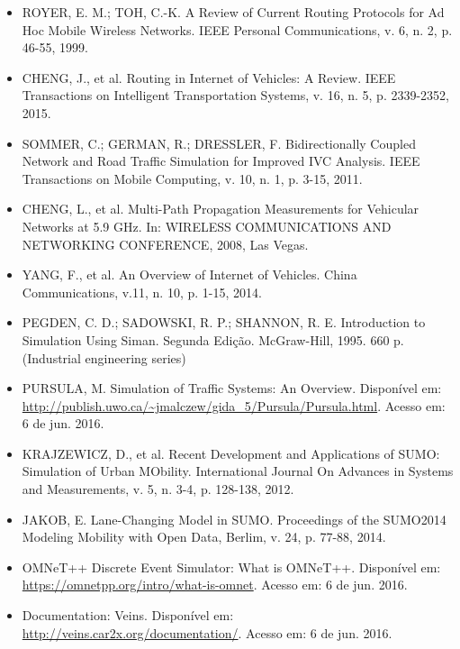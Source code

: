 \documentclass[
12pt,				%
openright,			%
oneside,			%
a4paper,			%
brazil,				%
]{abntex2}
\begin{document}
{\begin{itemize}[label={}]
		\item ROYER, E. M.; TOH, C.-K. A Review of Current Routing Protocols for Ad Hoc Mobile Wireless Networks. IEEE Personal Communications, v. 6, n. 2, p. 46-55, 1999.
		
		\item CHENG, J., et al. Routing in Internet of Vehicles: A Review. IEEE Transactions on Intelligent Transportation Systems, v. 16, n. 5, p. 2339-2352, 2015.
		
		\item SOMMER, C.; GERMAN, R.; DRESSLER, F. Bidirectionally Coupled Network and Road Traffic Simulation for Improved IVC Analysis. IEEE Transactions on Mobile Computing, v. 10, n. 1, p. 3-15, 2011.
		
		\item CHENG, L., et al. Multi-Path Propagation Measurements for Vehicular Networks at 5.9 GHz. In: WIRELESS COMMUNICATIONS AND NETWORKING CONFERENCE, 2008, Las Vegas.
		
		\item YANG, F., et al. An Overview of Internet of Vehicles. China Communications, v.11, n. 10, p. 1-15, 2014.
		
		\item PEGDEN, C. D.; SADOWSKI, R. P.; SHANNON, R. E. Introduction to Simulation Using Siman. Segunda Edição. McGraw-Hill, 1995. 660 p. (Industrial engineering series)
		
		\item PURSULA, M. Simulation of Traffic Systems: An Overview. Disponível em: \url{http://publish.uwo.ca/~jmalczew/gida\_5/Pursula/Pursula.html}. Acesso em: 6 de jun. 2016.
		
		\item KRAJZEWICZ, D., et al. Recent Development and Applications of SUMO: Simulation of Urban MObility. International Journal On Advances in Systems and Measurements, v. 5, n. 3-4, p. 128-138, 2012.
		
		\item JAKOB, E. Lane-Changing Model in SUMO. Proceedings of the SUMO2014 Modeling Mobility with Open Data, Berlim, v. 24, p. 77-88, 2014.
		
		\item OMNeT++ Discrete Event Simulator: What is OMNeT++. Disponível em: \url{https://omnetpp.org/intro/what-is-omnet}. Acesso em: 6 de jun. 2016.
		
		\item Documentation: Veins. Disponível em: \url{http://veins.car2x.org/documentation/}. Acesso em: 6 de jun. 2016.
		

\end{itemize}}
\end{document}
